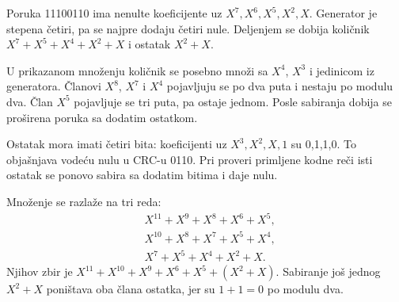 Poruka 11100110 ima nenulte koeficijente uz $X^7,X^6,X^5,X^2,X$. Generator je stepena četiri, pa se najpre dodaju četiri nule. Deljenjem se dobija količnik $X^7+X^5+X^4+X^2+X$ i ostatak $X^2+X$.

U prikazanom množenju količnik se posebno množi sa $X^4$, $X^3$ i jedinicom iz generatora. Članovi $X^8$, $X^7$ i $X^4$ pojavljuju se po dva puta i nestaju po modulu dva. Član $X^5$ pojavljuje se tri puta, pa ostaje jednom. Posle sabiranja dobija se proširena poruka sa dodatim ostatkom.

Ostatak mora imati četiri bita: koeficijenti uz $X^3,X^2,X,1$ su 0,1,1,0. To objašnjava vodeću nulu u CRC-u 0110. Pri proveri primljene kodne reči isti ostatak se ponovo sabira sa dodatim bitima i daje nulu.

Množenje se razlaže na tri reda:
\[
\begin{aligned}
&X^{11}+X^9+X^8+X^6+X^5,\\
&X^{10}+X^8+X^7+X^5+X^4,\\
&X^7+X^5+X^4+X^2+X.
\end{aligned}
\]
Njihov zbir je $X^{11}+X^{10}+X^9+X^6+X^5+(X^2+X)$. Sabiranje još jednog $X^2+X$ poništava oba člana ostatka, jer su $1+1=0$ po modulu dva.
